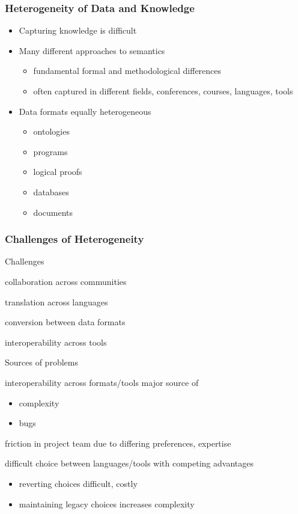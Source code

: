 \begin{frame}\frametitle{Heterogeneity of Data and Knowledge}
\begin{itemize}
\item Capturing knowledge is difficult
\item Many different approaches to semantics
 \begin{itemize}
  \item fundamental formal and methodological differences
  \item often captured in different fields, conferences, courses, languages, tools
 \end{itemize}
\item Data formats equally heterogeneous
 \begin{itemize}
 \item ontologies
 \item programs
 \item logical proofs
 \item databases
 \item documents
 \end{itemize}
\end{itemize}
\end{frame}

\begin{frame}\frametitle{Challenges of Heterogeneity}
\begin{blockitems}{Challenges}
\item collaboration across communities
\item translation across languages
\item conversion between data formats
\item interoperability across tools
\end{blockitems}

\begin{blockitems}{Sources of problems}
\item interoperability across formats/tools major source of
 \begin{itemize}
 \item complexity
 \item bugs
 \end{itemize}
\item friction in project team due to differing preferences, expertise
\item difficult choice between languages/tools with competing advantages
\begin{itemize}
 \item reverting choices difficult, costly
 \item maintaining legacy choices increases complexity
\end{itemize}
\end{blockitems}
\end{frame}

